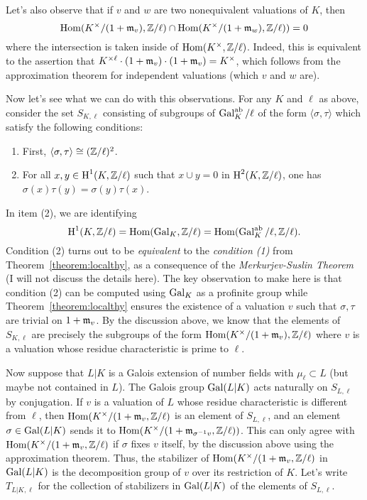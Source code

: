 Let's also observe that if $v$ and $w$ are two nonequivalent valuations of $K$, then
\[ \operatorname{Hom}(K^{\times}/(1 + \mathfrak{m}_{v}),\mathbb{Z}/\ell) \cap \operatorname{Hom}(K^{\times}/(1+\mathfrak{m}_{w}),\mathbb{Z}/\ell)) = 0 \]
where the intersection is taken inside of $\operatorname{Hom}(K^{\times},\mathbb{Z}/\ell)$.
Indeed, this is equivalent to the assertion that $K^{\times\ell} \cdot (1+\mathfrak{m}_{v}) \cdot (1+\mathfrak{m}_{v}) = K^{\times}$, which follows from the approximation theorem for independent valuations (which $v$ and $w$ are).

Now let's see what we can do with this observations.
For any $K$ and $\ell$ as above, consider the set $S_{K,\ell}$ consisting of subgroups of $\operatorname{Gal}_{K}^{\mathrm{ab}}/\ell$ of the form $\langle \sigma,\tau \rangle$ which satisfy the following conditions:
\begin{enumerate}
  \item First, $\langle \sigma,\tau \rangle \cong (\mathbb{Z}/\ell)^{2}$.
  \item For all $x,y \in \operatorname{H}^{1}(K,\mathbb{Z}/\ell)$ such that $x \cup y = 0$ in $\operatorname{H}^{2}(K,\mathbb{Z}/\ell)$, one has $\sigma(x)\tau(y) = \sigma(y) \tau(x)$.
\end{enumerate}
In item (2), we are identifying
\[ \operatorname{H}^{1}(K,\mathbb{Z}/\ell) = \operatorname{Hom}(\operatorname{Gal}_{K},\mathbb{Z}/\ell) = \operatorname{Hom}(\operatorname{Gal}_{K}^{\mathrm{ab}}/\ell,\mathbb{Z}/\ell). \]
Condition (2) turns out to be \emph{equivalent} to the \emph{condition (1)} from Theorem~\ref{theorem:localthy}, as a consequence of the \emph{Merkurjev-Suslin Theorem} (I will not discuss the details here).
The key observation to make here is that condition (2) can be computed using $\operatorname{Gal}_{K}$ as a profinite group while Theorem~\ref{theorem:localthy} ensures the existence of a valuation $v$ such that $\sigma,\tau$ are trivial on $1 + \mathfrak{m}_{v}$.
By the discussion above, we know that the elements of $S_{K,\ell}$ are precisely the subgroups of the form $\operatorname{Hom}(K^{\times}/(1+\mathfrak{m}_{v}),\mathbb{Z}/\ell)$ where $v$ is a valuation whose residue characteristic is prime to $\ell$.

Now suppose that $L|K$ is a Galois extension of number fields with $\mu_{\ell} \subset L$ (but maybe not contained in $L$).
The Galois group $\operatorname{Gal}(L|K)$ acts naturally on $S_{L,\ell}$ by conjugation.
If $v$ is a valuation of $L$ whose residue characteristic is  different from $\ell$, then $\operatorname{Hom}(K^{\times}/(1+\mathfrak{m}_{v},\mathbb{Z}/\ell)$ is an element of $S_{L,\ell}$, and an element $\sigma \in \operatorname{Gal}(L|K)$ sends it to $\operatorname{Hom}(K^{\times}/(1+\mathfrak{m}_{\sigma^{-1}v},\mathbb{Z}/\ell))$.
This can only agree with $\operatorname{Hom}(K^{\times}/(1+\mathfrak{m}_{v},\mathbb{Z}/\ell)$ if $\sigma$ fixes $v$ itself, by the discussion above using the approximation theorem.
Thus, the stabilizer of $\operatorname{Hom}(K^{\times}/(1+\mathfrak{m}_{v},\mathbb{Z}/\ell)$ in $\operatorname{Gal}(L|K)$ is the decomposition group of $v$ over its restriction of $K$.
Let's write $T_{L|K,\ell}$ for the collection of stabilizers in $\operatorname{Gal}(L|K)$ of the elements of $S_{L,\ell}$.

